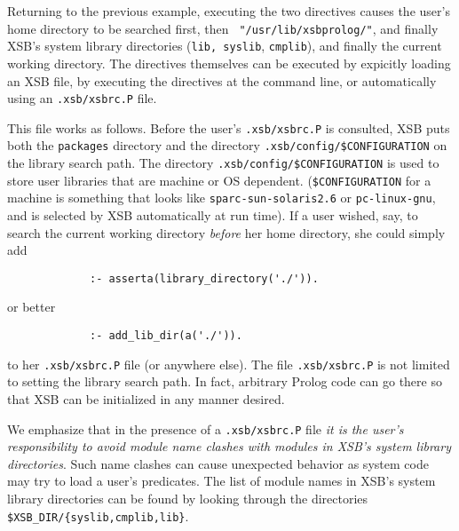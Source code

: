 
Returning to the previous example, executing the two directives causes
the user's home directory to be searched first, then {\tt
  "/usr/lib/xsbprolog/"}, and finally XSB's system library directories
({\tt lib, syslib}, {\tt cmplib}), and finally the current working
directory.  The directives themselves can be executed by expicitly
loading an XSB file, by executing the directives at the command line,
or automatically using an {\tt .xsb/xsbrc.P} file.  

This file works as follows.  Before the user's {\verb|.xsb/xsbrc.P|}
is consulted, XSB puts both the {\tt packages} directory and the
directory \verb|.xsb/config/$CONFIGURATION| on the library search
path.  The directory \verb'.xsb/config/$CONFIGURATION' is used to
store user libraries that are machine or OS
dependent. (\verb'$CONFIGURATION' for a machine is something that
looks like {\tt sparc-sun-solaris2.6} or {\tt pc-linux-gnu}, and is
selected by XSB automatically at run time).  If a user wished, say, to
search the current working directory {\em before} her home directory,
she could simply add
\begin{verbatim}
             :- asserta(library_directory('./')).
\end{verbatim}
or better
\begin{verbatim}
             :- add_lib_dir(a('./')).
\end{verbatim}
to her {\verb|.xsb/xsbrc.P|} file (or anywhere else).  The file
{\verb|.xsb/xsbrc.P|} is not limited to setting the library search
path.  In fact, arbitrary Prolog code can go there so that XSB can be
initialized in any manner desired.

We emphasize that in the presence of a {\verb|.xsb/xsbrc.P|} file {\em
it is the user's responsibility to avoid module name clashes with
modules in XSB's system library directories}.  Such name clashes can
cause unexpected behavior as system code may try to load a user's
predicates.  The list of module names in XSB's system library
directories can be found by looking through the directories {\tt
\$XSB\_DIR/\{syslib,cmplib,lib\}}.

